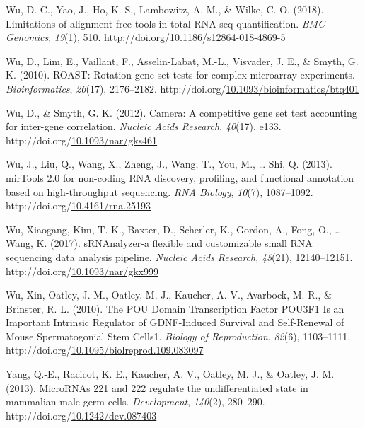 \documentclass[12pt,twoside]{reedthesis}
\newlength{\cslhangindent}
\newenvironment{CSLReferences}[2] %
 {%
  \setlength{\parindent}{0pt}
  \ifodd #1 \everypar{\setlength{\hangindent}{\cslhangindent}}\ignorespaces\fi
  \ifnum #2 > 0
  \setlength{\parskip}{#2\baselineskip}
  \fi
 }%
 {}
\begin{document}
\begin{CSLReferences}{1}{0}
\leavevmode{}%
Wu, D. C., Yao, J., Ho, K. S., Lambowitz, A. M., \& Wilke, C. O. (2018). Limitations of alignment-free tools in total RNA-seq quantification. \emph{BMC Genomics}, \emph{19}(1), 510. http://doi.org/\href{https://doi.org/10.1186/s12864-018-4869-5}{10.1186/s12864-018-4869-5}

\leavevmode{}%
Wu, D., Lim, E., Vaillant, F., Asselin-Labat, M.-L., Visvader, J. E., \& Smyth, G. K. (2010). ROAST: Rotation gene set tests for complex microarray experiments. \emph{Bioinformatics}, \emph{26}(17), 2176--2182. http://doi.org/\href{https://doi.org/10.1093/bioinformatics/btq401}{10.1093/bioinformatics/btq401}

\leavevmode{}%
Wu, D., \& Smyth, G. K. (2012). Camera: A competitive gene set test accounting for inter-gene correlation. \emph{Nucleic Acids Research}, \emph{40}(17), e133. http://doi.org/\href{https://doi.org/10.1093/nar/gks461}{10.1093/nar/gks461}

\leavevmode{}%
Wu, J., Liu, Q., Wang, X., Zheng, J., Wang, T., You, M., \ldots{} Shi, Q. (2013). mirTools 2.0 for non-coding RNA discovery, profiling, and functional annotation based on high-throughput sequencing. \emph{RNA Biology}, \emph{10}(7), 1087--1092. http://doi.org/\href{https://doi.org/10.4161/rna.25193}{10.4161/rna.25193}

\leavevmode{}%
Wu, Xiaogang, Kim, T.-K., Baxter, D., Scherler, K., Gordon, A., Fong, O., \ldots{} Wang, K. (2017). sRNAnalyzer-a flexible and customizable small RNA sequencing data analysis pipeline. \emph{Nucleic Acids Research}, \emph{45}(21), 12140--12151. http://doi.org/\href{https://doi.org/10.1093/nar/gkx999}{10.1093/nar/gkx999}

\leavevmode{}%
Wu, Xin, Oatley, J. M., Oatley, M. J., Kaucher, A. V., Avarbock, M. R., \& Brinster, R. L. (2010). The POU Domain Transcription Factor POU3F1 Is an Important Intrinsic Regulator of GDNF-Induced Survival and Self-Renewal of Mouse Spermatogonial Stem Cells1. \emph{Biology of Reproduction}, \emph{82}(6), 1103--1111. http://doi.org/\href{https://doi.org/10.1095/biolreprod.109.083097}{10.1095/biolreprod.109.083097}

\leavevmode{}%
Yang, Q.-E., Racicot, K. E., Kaucher, A. V., Oatley, M. J., \& Oatley, J. M. (2013). MicroRNAs 221 and 222 regulate the undifferentiated state in mammalian male germ cells. \emph{Development}, \emph{140}(2), 280--290. http://doi.org/\href{https://doi.org/10.1242/dev.087403}{10.1242/dev.087403}


\end{CSLReferences}
\end{document}
